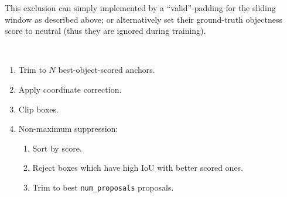 \begin{frame}[t]
\begin{description}[<only@+>]
{      This exclusion can simply implemented by a
      \enquote{valid}-padding for the sliding window as described
      above;
      or alternatively set their ground-truth objectness score to
      neutral (thus they are ignored during training).
    }
  \item<only@+->[Proposal selection]~
    \begin{enumerate}[<+->]
    \item Trim to $N$ best-object-scored anchors.
    \item Apply coordinate correction.
    \item Clip boxes.
    \item Non-maximum suppression:
      \begin{enumerate}
      \item Sort by score.
      \item Reject boxes which have high IoU with better scored ones.
      \item Trim to best \texttt{num\_proposals} proposals.
      \end{enumerate}
    \end{enumerate}
  \end{description}
\end{frame}

